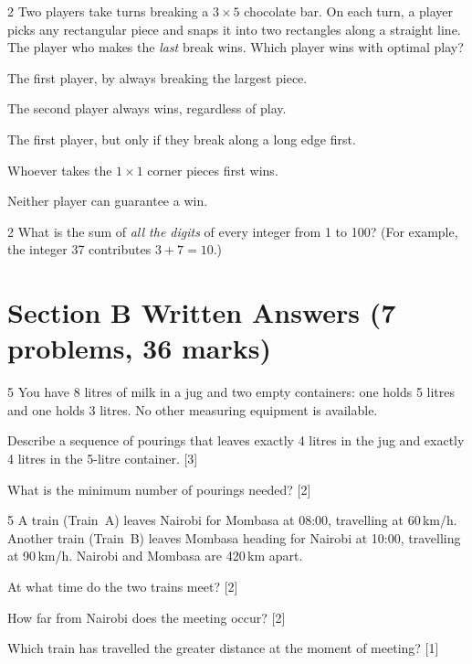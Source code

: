 \begin{problem}{2}
Two players take turns breaking a $3 \times 5$ chocolate bar.
On each turn, a player picks any rectangular piece and snaps it into two
rectangles along a straight line. The player who makes the \emph{last}
break wins. Which player wins with optimal play?
\begin{mcqlong}
  \item The first player, by always breaking the largest piece.
  \item The second player always wins, regardless of play.
  \item The first player, but only if they break along a long edge first.
  \item Whoever takes the $1\times 1$ corner pieces first wins.
  \item Neither player can guarantee a win.
\end{mcqlong}
\end{problem}

\begin{problem}{2}
What is the sum of \emph{all the digits} of every integer from 1 to 100?
(For example, the integer 37 contributes $3 + 7 = 10$.)
\end{problem}

\section*{Section B \quad Written Answers \hfill\normalsize (7 problems, 36 marks)}

\begin{problem}{5}
You have 8 litres of milk in a jug and two empty containers: one holds
5 litres and one holds 3 litres. No other measuring equipment is available.
\begin{parts}
  \item Describe a sequence of pourings that leaves exactly 4 litres in
        the jug and exactly 4 litres in the 5-litre container. \hfill [3]
  \item What is the minimum number of pourings needed? \hfill [2]
\end{parts}
\answerline
\end{problem}

\begin{problem}{5}
A train (Train~A) leaves Nairobi for Mombasa at 08:00, travelling at
60\,km/h. Another train (Train~B) leaves Mombasa heading for Nairobi at
10:00, travelling at 90\,km/h. Nairobi and Mombasa are 420\,km apart.
\begin{parts}
  \item At what time do the two trains meet? \hfill [2]
  \item How far from Nairobi does the meeting occur? \hfill [2]
  \item Which train has travelled the greater distance at the moment of meeting? \hfill [1]
\end{parts}
\answerline
\end{problem}

